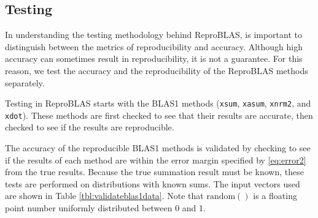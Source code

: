 \subsection{Testing}
  In understanding the testing methodology behind ReproBLAS, is important to distinguish between the metrics of reproducibility and accuracy. Although high accuracy can sometimes result in reproducibility, it is not a guarantee. For this reason, we test the accuracy and the reproducibility of the ReproBLAS methods separately.

  Testing in ReproBLAS starts with the BLAS1 methods (\texttt{xsum}, \texttt{xasum}, \texttt{xnrm2}, and \texttt{xdot}). These methods are first checked to see that their results are accurate, then checked to see if the results are reproducible.

  The accuracy of the reproducible BLAS1 methods is validated by checking to see if the results of each method are within the error margin specified by \eqref{eq:error2} from the true results. Because the true summation result must be known, these tests are performed on distributions with known sums. The input vectors used are shown in Table \ref{tbl:validateblas1data}. Note that $\text{random}()$ is a floating point number uniformly distributed between 0 and 1.

